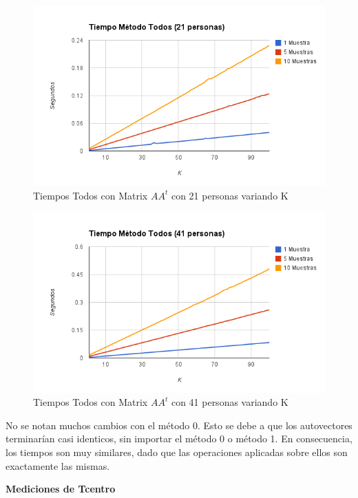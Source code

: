 \begin{figure}[H] \includegraphics[width=1\textwidth]{img/imagee.png} \caption{Tiempos Todos con
    Matrix $AA^t$ con 21 personas variando K} \end{figure}

\begin{figure}[H] \includegraphics[width=1\textwidth]{img/imagef.png} \caption{Tiempos Todos con
    Matrix $AA^t$ con 41 personas variando K} \end{figure}

No se notan muchos cambios con el método 0. Esto se debe a que los autovectores terminarían casi identicos, sin importar el método 0 o método 1. En consecuencia, los tiempos son muy similares, dado que las operaciones
aplicadas sobre ellos son exactamente las mismas.

\textbf{Mediciones de Tcentro }

